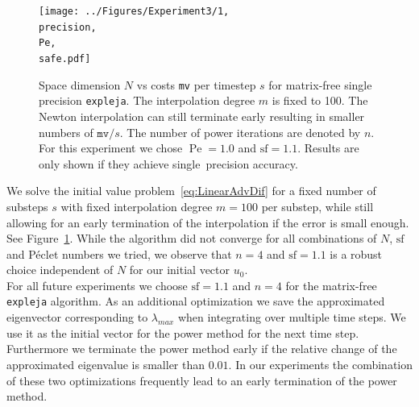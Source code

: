 \documentclass{scrartcl}
\begin{document}
	\begin{figure}[h]
		\newcommand{\Pe}{Pe=1.0}
		\newcommand{\precision}{single}
		\newcommand{\safe}{sf=1.1}
		
		\centering
		\texttt{[image: ../Figures/Experiment3/1, \\precision, \\Pe, \\safe.pdf]}
		\caption{Space dimension $N$ vs costs \texttt{mv} per timestep $s$ for matrix-free single precision \texttt{expleja}. The interpolation degree $m$ is fixed to 100. The Newton interpolation can still terminate early resulting in smaller numbers of $\texttt{mv}/s$. The number of power iterations are denoted by $n$. For this experiment we chose $\operatorname{Pe}=1.0$ and $\text{sf}=1.1$. Results are only shown if they achieve \precision\ precision accuracy.} \label{fig:Poweriterations}
	\end{figure}
	We solve the initial value problem~\eqref{eq:LinearAdvDif} for a fixed number of substeps $s$ with fixed interpolation degree $m=100$ per substep, while still allowing for an early termination of the interpolation if the error is small enough. See Figure~\ref{fig:Poweriterations}. While the algorithm did not converge for all combinations of $N$, $\text{sf}$ and P\'eclet numbers we tried, we observe that $n=4$ and $\text{sf}=1.1$ is a robust choice independent of $N$ for our initial vector $u_0$.\\
	For all future experiments we choose $\text{sf}=1.1$ and $n=4$ for the matrix-free \texttt{expleja} algorithm. As an additional optimization we save the approximated eigenvector corresponding to $\lambda_{max}$ when integrating over multiple time steps. We use it as the initial vector for the power method for the next time step. Furthermore we terminate the power method early if the relative change of the approximated eigenvalue is smaller than $0.01$. In our experiments the combination of these two optimizations frequently lead to an early termination of the power method. 
	
\end{document}
